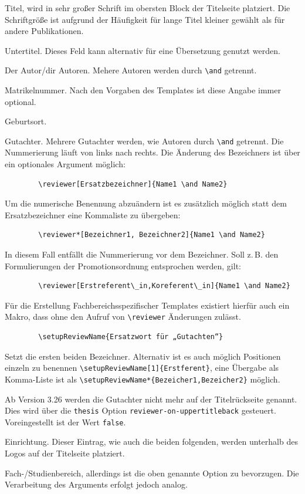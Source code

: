 \documentclass[
	german,%
	accentcolor=9c,%
	ruledheaders=section,%
	class=report,%
	thesis={type=bachelor},%
	fontsize=11pt,%
	parskip=half-,%
	custommargins=true,%
	marginpar=false,%
]{tudapub}
\begin{document}
\begin{description}
	\item[title] Titel, wird in sehr großer Schrift im obersten Block der Titelseite platziert. Die Schriftgröße ist aufgrund der Häufigkeit für lange Titel kleiner gewählt als für andere Publikationen.
	\item[subtitle] Untertitel. Dieses Feld kann alternativ für eine Übersetzung genutzt werden.
	\item[author] Der Autor/dir Autoren. Mehere Autoren werden durch \verb+\and+ getrennt.
	\item[studentID] Matrikelnummer. Nach den Vorgaben des Templates ist diese Angabe immer optional.
	\item[birthplace] Geburtsort.
	\item[reviewer] Gutachter. Mehrere Gutachter werden, wie Autoren durch \verb+\and+ getrennt. Die Nummerierung läuft von links nach rechts.
	      Die Änderung des Bezeichners ist über ein optionales Argument möglich:
\begin{verbatim}
        \reviewer[Ersatzbezeichner]{Name1 \and Name2}
\end{verbatim}
	      Um die numerische Benennung abzuändern ist es zusätzlich möglich statt dem Ersatzbezeichner eine Kommaliste zu übergeben:
\begin{verbatim}
        \reviewer*[Bezeichner1, Bezeichner2]{Name1 \and Name2}
\end{verbatim}
	      In diesem Fall entfällt die Nummerierung vor dem Bezeichner. Soll z.\,B. den Formulierungen der Promotionsordnung entsprochen werden, gilt:
\begin{verbatim}
        \reviewer[Erstreferent\_in,Koreferent\_in]{Name1 \and Name2}
\end{verbatim}
	      Für die Erstellung Fachbereichsspezifischer Templates existiert hierfür auch ein Makro, dass ohne den Aufruf von \verb+\reviewer+ Änderungen zulässt.
\begin{verbatim}
        \setupReviewName{Ersatzwort für „Gutachten“}
\end{verbatim}
	      Setzt die ersten beiden Bezeichner. Alternativ ist es auch möglich Positionen einzeln zu benennen \verb+\setupReviewName[1]{Erstferent}+, eine Übergabe als Komma-Liste ist als \verb+\setupReviewName*{Bezeicher1,Bezeicher2}+ möglich.

	      Ab Version 3.26 werden die Gutachter nicht mehr auf der Titelrückseite genannt. Dies wird über die \verb+thesis+ Option \verb+reviewer-on-uppertitleback+ gesteuert. Voreingestellt ist der Wert \verb+false+.
	\item[institution] Einrichtung. Dieser Eintrag, wie auch die beiden folgenden, werden unterhalb des Logos auf der Titelseite platziert.
	\item[department] Fach-/Studienbereich, allerdings ist die oben genannte Option zu bevorzugen. Die Verarbeitung des Arguments erfolgt jedoch analog.


\end{description}
\end{document}
